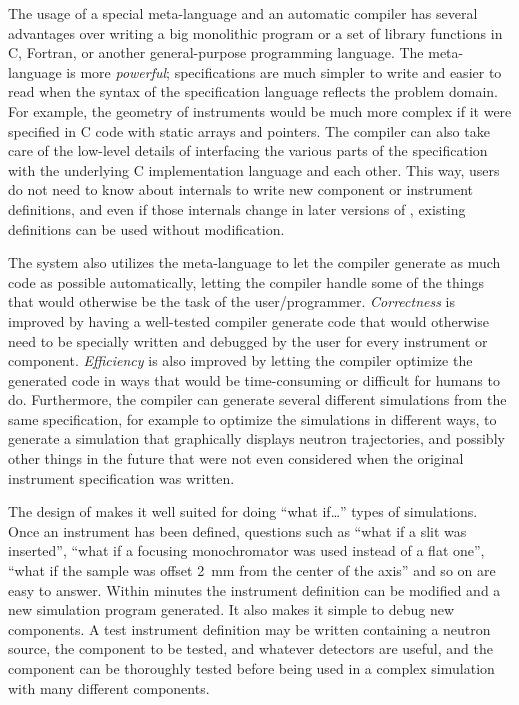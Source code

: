 The usage of a special meta-language and an automatic compiler has
several advantages over writing a big monolithic program or a set of
library functions in C, Fortran, or another general-purpose programming
language.  The meta-language is more \textit{powerful}; specifications
are much simpler to write and easier to read when the syntax of the
specification language reflects the problem domain. For example, the
geometry of instruments would be much more complex if it were specified
in C code with static arrays and pointers. The compiler can also take
care of the low-level details of interfacing the various parts of the
specification with the underlying C implementation language and each
other. This way, users do not need to know about \MCS internals to
write new component or instrument definitions, and even if those
internals change in later versions of \MCS, existing definitions can be
used without modification.

The \MCS system also utilizes the meta-language to let the \MCS 
compiler generate as much code as possible automatically, letting the
compiler handle some of the things that would otherwise be the task of
the user/programmer. \textit{Correctness} is improved by having a well-tested
compiler generate code that would otherwise need to be specially written
and debugged by the user for every instrument or component. \textit{Efficiency}
is also improved by letting the compiler optimize the generated code in
ways that would be time-consuming or difficult for humans to do. Furthermore, the
compiler can generate several different simulations from the same
specification, for example to optimize the simulations in different
ways, to generate a simulation that graphically displays neutron
trajectories, and possibly other things in the future that were not even
considered when the original instrument specification was written.

The design of \MCS makes it well suited for doing ``what if\ldots''
types of simulations. Once an instrument has been defined, questions
such as ``what if a slit was inserted'', ``what if a focusing
monochromator was used instead of a flat one'', ``what if the sample was
offset 2~mm from the center of the axis'' and so on are easy to answer. Within
minutes the instrument definition can be modified and a
new simulation program generated. It also makes it simple to debug new
components. A test instrument definition may be written
containing a neutron source, the component to be tested, and whatever
detectors are useful, and the component can be thoroughly tested before
being used in a complex simulation with many different components.

